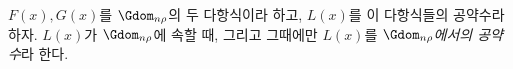 
$F(x),G(x)$를 $\Gdom_{n\rho}$의 두 다항식이라 하고, $L(x)$를 이 다항식들의 공약수라 하자. $L(x)$가 $\Gdom_{n\rho}$에 속할 때, 그리고 그때에만 $L(x)$를 \emph{$\Gdom_{n\rho}$에서의 공약수}라 한다.
